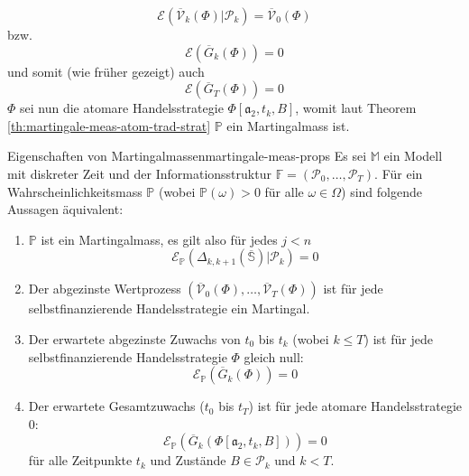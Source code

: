 \documentclass[11pt]{report} %
\begin{document}
$$\mathcal{E}(\overline{\mathcal{V}}_{k}(\Phi)|\mathcal{P}_k) = \overline{\mathcal{V}}_0(\Phi)$$
bzw.$$\mathcal{E}(\overline{G}_k(\Phi))=0$$
und somit (wie früher gezeigt) auch$$\mathcal{E}(\overline{G}_T(\Phi))=0$$
$\Phi$ sei nun die atomare Handelsstrategie $\Phi[\mathfrak{a}_2, t_k, B]$, womit laut Theorem \ref{th:martingale-meas-atom-trad-strat} $\mathbb{P}$ ein Martingalmass ist.\ 
\begin{Theorem}{Eigenschaften von Martingalmassen}{martingale-meas-props}
    Es sei $\mathbb{M}$ ein Modell mit diskreter Zeit und der Informationsstruktur $\mathbb{F}=(\mathcal{P}_0, \ldots, \mathcal{P}_T)$. Für ein Wahrscheinlichkeitsmass $\mathbb{P}$ (wobei $\mathbb{P}(\omega)>0$ für alle $\omega \in \Omega$) sind folgende Aussagen äquivalent:
    \begin{enumerate}
        \item $\mathbb{P}$ ist ein Martingalmass, es gilt also für jedes $j<n$ $$\mathcal{E}_\mathbb{P}(\Delta_{k, k+1}(\overline{\mathbb{S}})|\mathcal{P}_k)=0$$
        \item Der abgezinste Wertprozess $(\overline{\mathcal{V}}_0(\Phi), \ldots, \overline{\mathcal{V}}_T(\Phi))$ ist für jede selbstfinanzierende Handelsstrategie ein Martingal.
        \item Der erwartete abgezinste Zuwachs von $t_0$ bis $t_k$ (wobei $k \leq T$) ist für jede selbstfinanzierende Handelsstrategie $\Phi$ gleich null: $$\mathcal{E}_\mathbb{P}(\overline{G}_k(\Phi))=0$$
        \item Der erwartete Gesamtzuwachs ($t_0$ bis $t_T$) ist für jede atomare Handelsstrategie 0: $$\mathcal{E}_\mathbb{P}(\overline{G}_k(\Phi[\mathfrak{a}_2, t_k, B]))=0$$ für alle Zeitpunkte $t_k$ und Zustände $B \in \mathcal{P}_k$ und $k<T$.
    \end{enumerate}
\end{Theorem}
\end{document}
